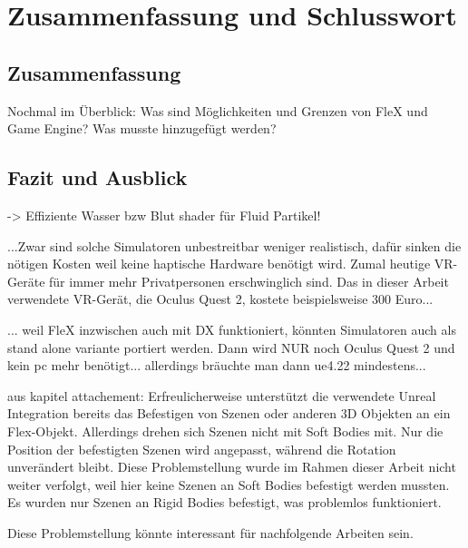 \chapter{Zusammenfassung und Schlusswort}

\section{Zusammenfassung}
Nochmal im Überblick: Was sind Möglichkeiten und Grenzen von FleX und Game Engine? Was musste hinzugefügt werden?

\section{Fazit und Ausblick}

-> Effiziente Wasser bzw Blut shader für Fluid Partikel!

...Zwar sind solche Simulatoren unbestreitbar weniger realistisch, dafür sinken die nötigen Kosten weil keine haptische Hardware benötigt wird. Zumal heutige VR-Geräte für immer mehr Privatpersonen erschwinglich sind. Das in dieser Arbeit verwendete VR-Gerät, die Oculus Quest 2, kostete beispielsweise 300 Euro...

... weil FleX inzwischen auch mit DX funktioniert, könnten Simulatoren auch als stand alone variante portiert werden. Dann wird NUR  noch Oculus Quest 2 und kein pc mehr benötigt... allerdings bräuchte man dann ue4.22 mindestens...


aus kapitel attachement:
Erfreulicherweise unterstützt die verwendete Unreal Integration bereits das Befestigen von Szenen oder anderen 3D Objekten an ein Flex-Objekt. Allerdings drehen sich Szenen nicht mit Soft Bodies mit. Nur die Position der befestigten Szenen wird angepasst, während die Rotation unverändert bleibt. 
Diese Problemstellung wurde im Rahmen dieser Arbeit nicht weiter verfolgt, weil hier keine Szenen an Soft Bodies befestigt werden mussten. Es wurden nur Szenen an Rigid Bodies befestigt, was problemlos funktioniert.

Diese Problemstellung könnte interessant für nachfolgende Arbeiten sein.


